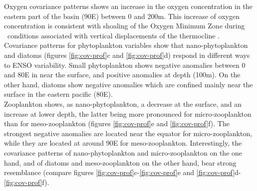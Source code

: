 Oxygen covariance patterns shows an increase in the oxygen concentration in the eastern part of the basin (90E) between 0 and 200m. This increase of oxygen concentration 
is consistent with shoaling of the Oxygen Minimum Zone during \nino\ conditions associated with vertical displacements of the thermocline \citep{leungENSODrivesNearsurface2019, espinoza-morriberonOxygenVariabilityENSO2019}. \\

Covariance patterns for phytoplankton variables show that nano-phytoplankton and diatoms (figures \ref{fig:cov-prof}c and \ref{fig:cov-prof}d) respond in different ways to ENSO variability. Small phytoplankton shows negative anomalies between 0 and 80E in near the surface, and positive anomalies at depth (100m). On the other hand, diatoms show negative anomalies which are confined mainly near the surface in the eastern pacific (80E).\\

Zooplankton shows, as nano-phytoplankton, a decrease at the surface, and an 
increase at lower depth, the latter being more pronounced for micro-zooplankton than for meso-zooplankton (figures \ref{fig:cov-prof}e and \ref{fig:cov-prof}f). The strongest negative anomalies 
are located near the equator for micro-zooplankton, while they are located at around 90E for meso-zooplankton. 
Interestingly, the covariance patterns of nano-phytoplankton and micro-zooplankton on the one hand, and of diatoms and meso-zooplankton on the other hand, bear strong resemblance (compare figures \ref{fig:cov-prof}c-\ref{fig:cov-prof}e and \ref{fig:cov-prof}d-\ref{fig:cov-prof}f). \\

